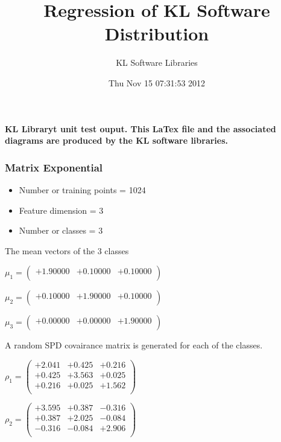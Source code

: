 \documentclass[12pt]{article}
\theoremstyle{definition}
\theoremstyle{remark}
\numberwithin{equation}{section}
\begin{document}
\title{Regression of KL Software Distribution   }
\author{KL Software Libraries}
\date{Thu Nov 15 07:31:53 2012
}
\maketitle
\textbf{ KL Libraryt unit test ouput.  This LaTex file and the associated diagrams 		are produced by the KL software libraries.}
\subsubsection{Matrix Exponential }
\begin{itemize}
\item Number or training points = 1024
\item Feature dimension = 3
\item Number or classes = 3
\end{itemize}
{The mean vectors of the 3 classes}

$\mu_1 = \left(
\begin{array}{
ccc}
+1.90000 & +0.10000 & +0.10000 \\
\end{array}
\right)$

$\mu_2 = \left(
\begin{array}{
ccc}
+0.10000 & +1.90000 & +0.10000 \\
\end{array}
\right)$

$\mu_3 = \left(
\begin{array}{
ccc}
+0.00000 & +0.00000 & +1.90000 \\
\end{array}
\right)$

A random SPD covairance matrix is generated for each of the classes.\newline

$\rho_1 = \left(
\begin{array}{
ccc}
+2.041 & +0.425 & +0.216 \\
+0.425 & +3.563 & +0.025 \\
+0.216 & +0.025 & +1.562 \\
\end{array}
\right)$

$\rho_2 = \left(
\begin{array}{
ccc}
+3.595 & +0.387 & -0.316 \\
+0.387 & +2.025 & -0.084 \\
-0.316 & -0.084 & +2.906 \\
\end{array}
\right)$
\end{document}
